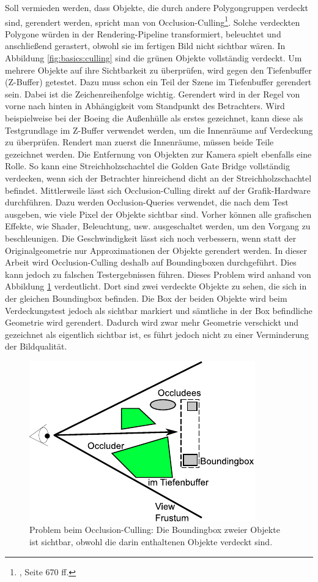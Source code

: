 Soll vermieden werden, dass Objekte, die durch andere Polygongruppen verdeckt sind, gerendert werden, spricht man von Occlusion-Culling\footnote{\cite{RTR3}, Seite 670 ff.}. Solche verdeckten Polygone würden in der Rendering-Pipeline transformiert, beleuchtet und anschließend gerastert, obwohl sie im fertigen Bild nicht sichtbar wären. In Abbildung \ref{fig:basics:culling} sind die grünen Objekte vollständig verdeckt. Um mehrere Objekte auf ihre Sichtbarkeit zu überprüfen, wird gegen den Tiefenbuffer (Z-Buffer) getestet. Dazu muss schon ein Teil der Szene im Tiefenbuffer gerendert sein. Dabei ist die Zeichenreihenfolge wichtig. Gerendert wird in der Regel von vorne nach hinten in Abhängigkeit vom Standpunkt des Betrachters. Wird beispielweise bei der Boeing die Außenhülle als erstes gezeichnet, kann diese als Testgrundlage im Z-Buffer verwendet werden, um die Innenräume auf Verdeckung zu überprüfen. Rendert man zuerst die Innenräume, müssen beide Teile gezeichnet werden. Die Entfernung von Objekten zur Kamera spielt ebenfalls eine Rolle. So kann eine Streichholzschachtel die Golden Gate Bridge vollständig verdecken, wenn sich der Betrachter hinreichend dicht an der Streichholzschachtel befindet. Mittlerweile lässt sich Occlusion-Culling direkt auf der Grafik-Hardware durchführen. Dazu werden Occlusion-Queries verwendet, die nach dem Test ausgeben, wie viele Pixel der Objekte sichtbar sind. Vorher können alle grafischen Effekte, wie Shader, Beleuchtung, usw. ausgeschaltet werden, um den Vorgang zu beschleunigen. Die Geschwindigkeit lässt sich noch verbessern, wenn statt der Originalgeometrie nur Approximationen der Objekte gerendert werden. In dieser Arbeit wird Occlusion-Culling deshalb auf Boundingboxen durchgeführt. Dies kann jedoch zu falschen Testergebnissen führen. Dieses Problem wird anhand von Abbildung \ref{fig:basics:oculling} verdeutlicht. Dort sind zwei verdeckte Objekte zu sehen, die sich in der gleichen Boundingbox befinden. Die Box der beiden Objekte wird beim Verdeckungstest jedoch als sichtbar markiert und sämtliche in der Box befindliche Geometrie wird gerendert. Dadurch wird zwar mehr Geometrie verschickt und gezeichnet als eigentlich sichtbar ist, es führt jedoch nicht zu einer Verminderung der Bildqualität.
\begin{figure}
  \centering
  \includegraphics[scale=0.8]{images/oculling.pdf}
  \caption{\label{fig:basics:oculling}Problem beim Occlusion-Culling: Die Boundingbox zweier Objekte ist sichtbar, obwohl die darin enthaltenen Objekte verdeckt sind.}
  
\end{figure}

